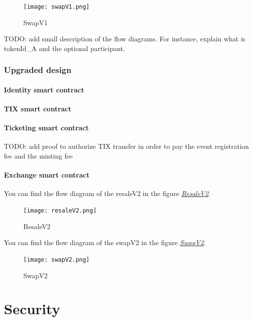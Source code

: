 \documentclass[a4paper,11pt,oneside]{report}
\begin{document}
\begin{figure}[h!]
  \texttt{[image: swapV1.png]}
  \caption{SwapV1}
  \label{fig:swapV1}
\end{figure}

TODO: add small description of the flow diagrams. For instance, explain what is tokenId\_A and the optional participant.

\subsection{Upgraded design}

\subsubsection{Identity smart contract}

\subsubsection{TIX smart contract}

\subsubsection{Ticketing smart contract}
TODO: add proof to authorize TIX transfer in order to pay the event registration fee and the minting fee

\subsubsection{Exchange smart contract}

You can find the flow diagram of the resaleV2 in the figure \hyperref[fig:resaleV2]{ \textit{ResaleV2}}.

\begin{figure}[h!]
  \texttt{[image: resaleV2.png]}
  \caption{ResaleV2}
  \label{fig:resaleV2}
\end{figure}

You can find the flow diagram of the swapV2 in the figure \hyperref[fig:swapV2]{ \textit{SwapV2}}.

\begin{figure}[h!] 
  \centering
  \texttt{[image: swapV2.png]}
  \caption{SwapV2}
  \label{fig:swapV2}
\end{figure}

\chapter{Security}
\end{document}
